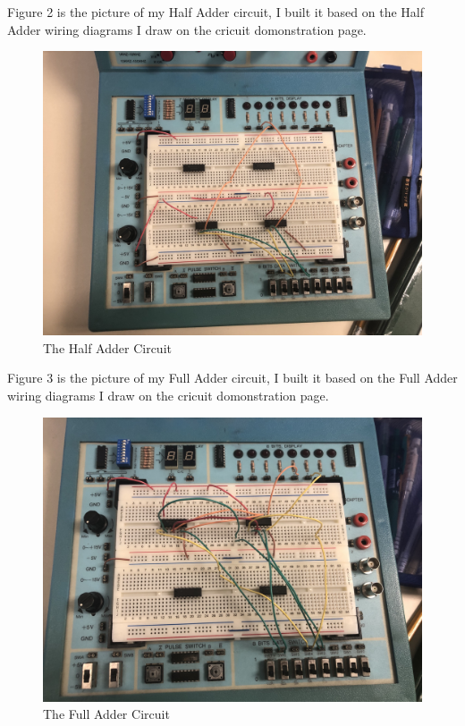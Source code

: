 \documentclass[11pt]{article}
\begin{document}
	Figure 2 is the picture of my Half Adder circuit, I built it based on the Half Adder wiring diagrams I draw on the cricuit domonstration page.\\
	\begin{figure}[ht]\centering
		\includegraphics[width=1.0\textwidth,trim=20cm 15cm 20cm 15cm,clip]{HalfAdder}
		\caption{The Half Adder Circuit}
		\label{fig:HalfAdder}
	\end{figure}

	 Figure 3 is the picture of my Full Adder circuit, I built it based on the Full Adder wiring diagrams I draw on the cricuit domonstration page.\\
	\begin{figure}[ht]\centering
		\includegraphics[width=1.0\textwidth]{FullAdder}
		\caption{The Full Adder Circuit}
		\label{fig:FullAdder}
	\end{figure}
\end{document}
